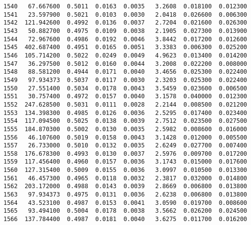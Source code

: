 \documentclass[11pt]{article}
\begin{document}
\begin{Verbatim}[commandchars=\\\{\}]
1540   67.667600  0.5011  0.0163  0.0035   3.2608  0.018100  0.012300   
1541   23.597900  0.5021  0.0103  0.0030   2.0418  0.026600  0.006300   
1542  121.942600  0.4992  0.0136  0.0037   2.7204  0.021600  0.026300   
1543   50.882700  0.4975  0.0109  0.0038   2.1905  0.027300  0.013900   
1544   72.967600  0.4986  0.0192  0.0046   3.8442  0.017200  0.012600   
1545  402.687400  0.4951  0.0165  0.0051   3.3383  0.006300  0.025200   
1546  105.714200  0.5022  0.0249  0.0049   4.9623  0.013400  0.014200   
1547   36.297500  0.5012  0.0160  0.0044   3.2008  0.022200  0.008000   
1548   88.581200  0.4944  0.0171  0.0040   3.4656  0.025300  0.022400   
1549   97.934373  0.5037  0.0117  0.0030   2.3203  0.025300  0.022400   
1550   27.551400  0.5034  0.0178  0.0043   3.5459  0.023600  0.006500   
1551   30.757400  0.4972  0.0157  0.0040   3.1578  0.040000  0.012300   
1552  247.628500  0.5031  0.0111  0.0028   2.2144  0.008500  0.021200   
1553  134.398300  0.4985  0.0126  0.0036   2.5295  0.017400  0.023400   
1554  117.094500  0.5025  0.0138  0.0039   2.7512  0.023500  0.027500   
1555  184.870300  0.5002  0.0130  0.0035   2.5982  0.008600  0.016000   
1556   46.107600  0.5019  0.0158  0.0043   3.1428  0.012000  0.005500   
1557   26.733000  0.5010  0.0132  0.0035   2.6249  0.027700  0.007400   
1558  176.678300  0.4993  0.0130  0.0037   2.5976  0.009700  0.017200   
1559  117.456400  0.4960  0.0157  0.0036   3.1743  0.015000  0.017600   
1560  127.315400  0.5009  0.0155  0.0036   3.0997  0.010500  0.013300   
1561   46.457300  0.4965  0.0118  0.0032   2.3817  0.032000  0.014800   
1562  203.172000  0.4988  0.0143  0.0039   2.8669  0.006800  0.013800   
1563   97.934373  0.4975  0.0131  0.0036   2.6238  0.006800  0.013800   
1564   43.523100  0.4987  0.0153  0.0041   3.0590  0.019700  0.008600   
1565   93.494100  0.5004  0.0178  0.0038   3.5662  0.026200  0.024500   
1566  137.784400  0.4987  0.0181  0.0040   3.6275  0.011700  0.016200   


\end{Verbatim}
\end{document}
